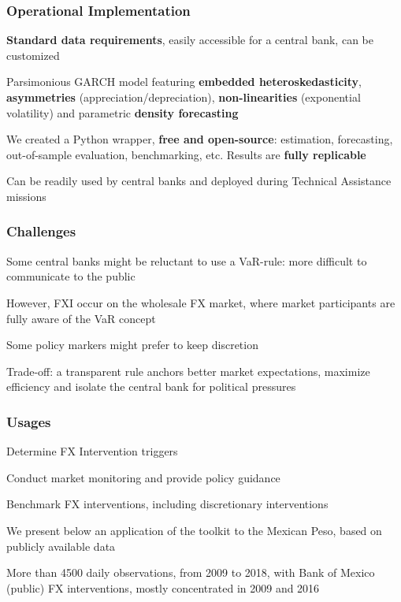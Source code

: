 \documentclass{beamer}
\newenvironment{largeitemize}{\itemize\addtolength{\itemsep}{10pt}}{\enditemize}
\newenvironment{largeenumerate}{\enumerate\addtolength{\itemsep}{10pt}}{\endenumerate}
\begin{document}
\begin{frame}
  \frametitle{Operational Implementation}
  \begin{largeitemize}
  \item \textbf{Standard data requirements}, easily accessible for a central
    bank, can be customized
  \item Parsimonious GARCH model featuring \textbf{embedded heteroskedasticity},  \textbf{asymmetries}
    (appreciation/depreciation), \textbf{non-linearities} (exponential
    volatility) and parametric \textbf{density forecasting}    
  \item We created a Python wrapper, \textbf{free and open-source}: estimation, forecasting,
    out-of-sample evaluation, benchmarking, etc. Results are \textbf{fully replicable}
  \item Can be readily used by central banks and deployed during Technical Assistance missions
  \end{largeitemize}
\end{frame}


\begin{frame}
  \frametitle{Challenges}
  \begin{largeitemize}
      \item Some central banks might be reluctant to use a VaR-rule: more
        difficult to communicate to the public
      \item However, FXI occur on the wholesale FX market, where market
        participants are fully aware of the VaR concept
    \item Some policy markers might prefer to keep discretion
    \item Trade-off: a transparent rule anchors better market expectations,
      maximize efficiency and isolate the central bank for political pressures    
  \end{largeitemize}
\end{frame}

\begin{frame}
  \frametitle{Usages}    
  \begin{largeenumerate}
    \item Determine FX Intervention triggers
    \item Conduct market monitoring and provide policy guidance
    \item Benchmark FX interventions, including discretionary interventions
    \end{largeenumerate}
    
    \bigskip
    
  \begin{largeitemize}
    \item We present below an application of the toolkit to the Mexican Peso, based on publicly
      available data
    \item More than 4500 daily observations, from 2009 to 2018, with Bank of
      Mexico (public) FX interventions, mostly concentrated in 2009 and 2016
    \end{largeitemize}
    
\end{frame}
\end{document}
